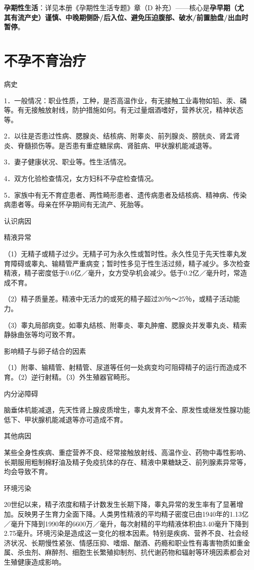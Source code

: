 \documentclass[12pt,UTF8,openany]{ctexbook}
\begin{document}
\textbf{孕期性生活}：详见本册《孕期性生活专题》章（D 补充）——核心是\textbf{孕早期（尤其有流产史）谨慎、中晚期侧卧/后入位、避免压迫腹部、破水/前置胎盘/出血时暂停}。

\chapter{不孕不育治疗}


病史


1．一般情况：职业性质，工种，是否高温作业，有无接触工业毒物如铅、汞、磷等。有无接触放射线，防护措施如何。有无过量烟酒嗜好，营养状况，精神状态等。

2．以往是否患过性病、腮腺炎、结核病、附睾炎、前列腺炎、膀胱炎、肾盂肾炎、脊髓损伤等。是否患有重症糖尿病、肾脏病、甲状腺机能减退等。

3．妻子健康状况、职业等。性生活情况。

4．双方化验检查情况，女方妇科不孕症检查情况。

5．家族中有无不育症患者、两性畸形患者、遗传病患者及结核病、精神病、传染病患者等。母亲在怀孕期间有无流产、死胎等。





认识病因


精液异常

（1）无精子或精子过少。无精子可为永久性或暂时性。永久性见于先天性睾丸发育障碍或睾丸、输精管严重病变；暂时性多见于性生活过频，精子减少。多次检查精液，精子密度低于0.6亿／毫升，女方受孕机会减少。低于0.2亿／毫升时，常造成不育。

（2）精子质量差。精液中无活力的或死的精子超过20％～25％，或精子活动能力。

（3）睾丸局部病变。如睾丸结核、附睾炎、睾丸肿瘤、腮腺炎并发睾丸炎、精索静脉曲张等均可致不育。

影响精子与卵子结合的因素

（1）附睾、输精管、射精管、尿道等任何一处病变均可阻碍精子的运行而造成不育。（2）逆行射精。（3）外生殖器官畸形。

内分泌障碍

脑垂体机能减退，先天性肾上腺皮质增生，睾丸发育不全、原发性或继发性腺功能低下、甲状腺机能减退等亦可造成不育。

其他病因

某些全身性疾病、重症营养不良、经常接触放射线、高温作业、药物中毒性影响、长期服用粗制棉籽油及精子免疫抗体的存在、精液中果糖缺乏、前列腺素异常等，均会导致不育。

环境污染

20世纪以来，精子浓度和精子计数发生长期下降，睾丸异常的发生率有了显著增加。反映男子生育力全面下降。人类男性精液的平均精子密度已由1940年的1.13亿／毫升下降到1990年的6600万／毫升，每次射精的平均精液体积由3.40毫升下降到2.75毫升。环境污染是造成这一变化的根本因素。特别是疾病、营养不良、社会经济状况、长期慢性紧张、情感压抑、嗜烟、酗酒、药瘾和职业性有毒害物质如重金属、杀虫剂、麻醉剂、细胞生长繁殖抑制剂、抗代谢药物和辐射等环境因素都会对生殖健康造成影响。
\end{document}
